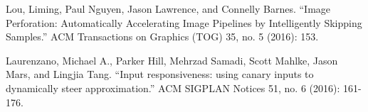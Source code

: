 \begin{thebibliography}{}
  Lou, Liming, Paul Nguyen, Jason Lawrence, and Connelly Barnes. ``Image Perforation: Automatically Accelerating Image Pipelines by Intelligently Skipping Samples.'' ACM Transactions on Graphics (TOG) 35, no. 5 (2016): 153.

  Laurenzano, Michael A., Parker Hill, Mehrzad Samadi, Scott Mahlke, Jason Mars, and Lingjia Tang. ``Input responsiveness: using canary inputs to dynamically steer approximation.'' ACM SIGPLAN Notices 51, no. 6 (2016): 161-176.
  
\end{thebibliography}
